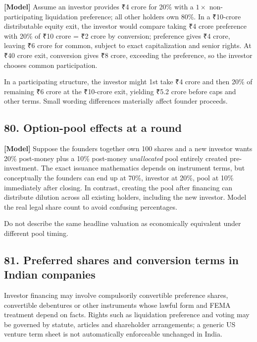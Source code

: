 \textbf{[Model]} Assume an investor provides \textnormal{₹}4 crore for 20\% with a $1\times$ non-participating liquidation preference; all other holders own 80\%. In a \textnormal{₹}10-crore distributable equity exit, the investor would compare taking \textnormal{₹}4 crore preference with 20\% of \textnormal{₹}10 crore = \textnormal{₹}2 crore by conversion; preference gives \textnormal{₹}4 crore, leaving \textnormal{₹}6 crore for common, subject to exact capitalization and senior rights. At \textnormal{₹}40 crore exit, conversion gives \textnormal{₹}8 crore, exceeding the preference, so the investor chooses common participation.

In a participating structure, the investor might 1st take \textnormal{₹}4 crore and then 20\% of remaining \textnormal{₹}6 crore at the \textnormal{₹}10-crore exit, yielding \textnormal{₹}5.2 crore before caps and other terms. Small wording differences materially affect founder proceeds.

\subsection{80. Option-pool effects at a round}

\textbf{[Model]} Suppose the founders together own 100 shares and a new investor wants 20\% post-money plus a 10\% post-money \textit{unallocated} pool entirely created pre-investment. The exact issuance mathematics depends on instrument terms, but conceptually the founders can end up at 70\%, investor at 20\%, pool at 10\% immediately after closing. In contrast, creating the pool after financing can distribute dilution across all existing holders, including the new investor. Model the real legal share count to avoid confusing percentages.

Do not describe the same headline valuation as economically equivalent under different pool timing.

\subsection{81. Preferred shares and conversion terms in Indian companies}

Investor financing may involve compulsorily convertible preference shares, convertible debentures or other instruments whose lawful form and FEMA treatment depend on facts. Rights such as liquidation preference and voting may be governed by statute, articles and shareholder arrangements; a generic US venture term sheet is not automatically enforceable unchanged in India.

